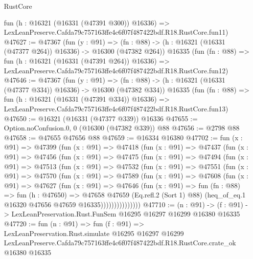 \begin{lexlean}{RustCore}
\begin{coremodule}
    fun (h : @16321 (@16331 (@47391 @300)) @16336) =>
    LexLeanPreserve.Cafda79c757163ffe4c6f07f487422bdf.R18.RustCore.fun11)
@47627 := @47367
    (fun (y : @91) =>
    (fn : @88) -> (h : @16321 (@16331 (@47377 @264)) @16336) -> @16300 (@47382 @264))
    @16335
    (fun (fn : @88) =>
    fun (h : @16321 (@16331 (@47391 @264)) @16336) =>
    LexLeanPreserve.Cafda79c757163ffe4c6f07f487422bdf.R18.RustCore.fun12)
@47646 := @47367
    (fun (y : @91) =>
    (fn : @88) -> (h : @16321 (@16331 (@47377 @334)) @16336) -> @16300 (@47382 @334))
    @16335
    (fun (fn : @88) =>
    fun (h : @16321 (@16331 (@47391 @334)) @16336) =>
    LexLeanPreserve.Cafda79c757163ffe4c6f07f487422bdf.R18.RustCore.fun13)
@47650 := @16321 (@16331 (@47377 @339)) @16336
@47655 := Option.noConfusion.{0, 0} (@16300 (@47382 @339)) @88
@47656 := @2798 @88
@47658 := @47655 @47656 @88
@47659 := @16334 @16380
@47702 := fun (x : @91) =>
  @47399
    (fun (x : @91) =>
    @47418
      (fun (x : @91) =>
      @47437
        (fun (x : @91) =>
        @47456
          (fun (x : @91) =>
          @47475
            (fun (x : @91) =>
            @47494
              (fun (x : @91) =>
              @47513
                (fun (x : @91) =>
                @47532
                  (fun (x : @91) =>
                  @47551
                    (fun (x : @91) =>
                    @47570
                      (fun (x : @91) =>
                      @47589
                        (fun (x : @91) =>
                        @47608
                          (fun (x : @91) =>
                          @47627
                            (fun (x : @91) =>
                            @47646
                              (fun (x : @91) =>
                              fun (fn : @88) =>
                              fun (h : @47650) =>
                              @47658
                                @47659
                                (Eq.refl.{2} (Sort 1) @88)
                                (heq_of_eq.{1} @16320 @47656 @47659 @16335)))))))))))))))
@47710 := (n : @91) ->
  (f : @91) -> LexLeanPreservation.Rust.FunSem @16295 @16297 @16299 @16380 @16335
@47720 := fun (n : @91) =>
  fun (f : @91) =>
  LexLeanPreservation.Rust.simulate
    @16295
    @16297
    @16299
    LexLeanPreserve.Cafda79c757163ffe4c6f07f487422bdf.R18.RustCore.crate_ok
    @16380
    @16335
\end{coremodule}
\end{lexlean}
